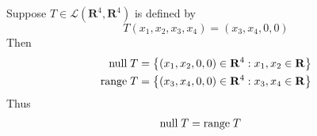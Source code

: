 \documentclass[a5paper]{article}
\begin{document}
\newcommand    \C  { \mathbf{C} }
\newcommand    \R  { \mathbf{R} }
\renewcommand  \L  { \mathcal{L} }
\newcommand    \F  { \mathbf{F} }
\newcommand    \nullspace { \text{null\;} }
\newcommand    \range     { \text{range\;} }

Suppose $T \in \L(\R^4, \R^4)$ is defined by
\begin{equation*}
    T(x_1,x_2,x_3,x_4) = (x_3, x_4, 0, 0)
\end{equation*}
Then
\begin{align*}
    \nullspace T &= \left\{ (x_1, x_2, 0, 0) \in \R^4 : x_1, x_2 \in \R \right\}    \\
        \range T &= \left\{ (x_3, x_4, 0, 0) \in \R^4 : x_3, x_4 \in \R \right\}
\end{align*}
Thus
\begin{align*}
    \nullspace T &= \range T
\end{align*}
\end{document}
